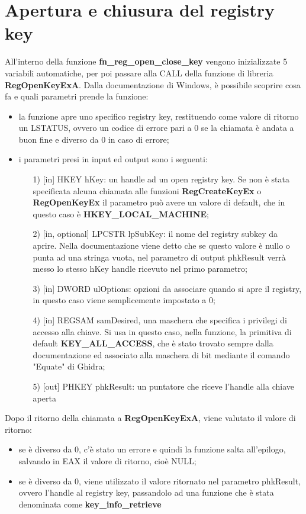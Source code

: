 \documentclass[12pt]{extarticle}
\begin{document}
\section{Apertura e chiusura del registry key}
All'interno della funzione \textbf{fn\_reg\_open\_close\_key} vengono inizializzate 5 variabili automatiche, per poi passare alla CALL della funzione di libreria \textbf{RegOpenKeyExA}. Dalla documentazione di Windows, è possibile scoprire cosa fa e quali parametri prende la funzione:
\begin{itemize}
\item la funzione apre uno specifico registry key, restituendo come valore di ritorno un \textsf{LSTATUS}, ovvero un codice di errore pari a 0 se la chiamata è andata a buon fine e diverso da 0 in caso di errore;
\item i parametri presi in input ed output sono i seguenti:
\begin{itemize}
\item[1)] [in] \textsf{HKEY hKey}: un handle ad un open registry key. Se non è stata specificata alcuna chiamata alle funzioni \textbf{RegCreateKeyEx} o \textbf{RegOpenKeyEx} il parametro può avere un valore di default, che in questo caso è \textbf{HKEY\_LOCAL\_MACHINE};
\item[2)] [in, optional] \textsf{LPCSTR lpSubKey}: il nome del registry subkey da aprire. Nella documentazione viene detto che se questo valore è nullo o punta ad una stringa vuota, nel parametro di output \textsf{phkResult} verrà messo lo stesso hKey handle ricevuto nel primo parametro;
\item[3)] [in] \textsf{DWORD  ulOptions}: opzioni da associare quando si apre il registry, in questo caso viene semplicemente impostato a 0;
\item[4)] [in] \textsf{REGSAM samDesired}, una maschera che specifica i privilegi di accesso alla chiave. Si usa in questo caso, nella funzione, la primitiva di default \textbf{KEY\_ALL\_ACCESS}, che è stato trovato sempre dalla documentazione ed associato alla maschera di bit mediante il comando "Equate" di Ghidra;
\item[5)] [out] \textsf{PHKEY  phkResult}: un puntatore che riceve l'handle alla chiave aperta
\end{itemize}
\end{itemize}
Dopo il ritorno della chiamata a \textbf{RegOpenKeyExA}, viene valutato il valore di ritorno:
\begin{itemize}
\item se è diverso da 0, c'è stato un errore e quindi la funzione salta all'epilogo, salvando in EAX il valore di ritorno, cioè NULL;
\item se è diverso da 0, viene utilizzato il valore ritornato nel parametro \textsf{phkResult}, ovvero l'handle al registry key, passandolo ad una funzione che è stata denominata come \textbf{key\_info\_retrieve}
\end{itemize}
\end{document}
